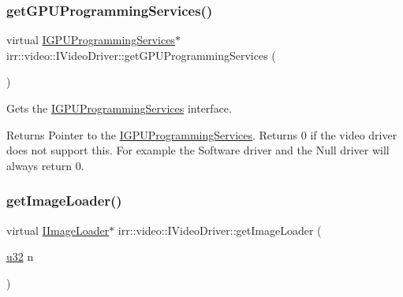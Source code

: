 \subsubsection{\texorpdfstring{get\+G\+P\+U\+Programming\+Services()}{getGPUProgrammingServices()}\hspace{0.1cm}{\footnotesize\ttfamily [2/2]}}
{\footnotesize\ttfamily virtual \hyperlink{classirr_1_1video_1_1IGPUProgrammingServices}{I\+G\+P\+U\+Programming\+Services}$\ast$ irr\+::video\+::\+I\+Video\+Driver\+::get\+G\+P\+U\+Programming\+Services (\begin{DoxyParamCaption}{ }\end{DoxyParamCaption})\hspace{0.3cm}{\ttfamily [pure virtual]}}



Gets the \hyperlink{classirr_1_1video_1_1IGPUProgrammingServices}{I\+G\+P\+U\+Programming\+Services} interface. 

\begin{DoxyReturn}{Returns}
Pointer to the \hyperlink{classirr_1_1video_1_1IGPUProgrammingServices}{I\+G\+P\+U\+Programming\+Services}. Returns 0 if the video driver does not support this. For example the Software driver and the Null driver will always return 0. 
\end{DoxyReturn}
\mbox{\label{classirr_1_1video_1_1IVideoDriver_a5cc08e7cd2ce2a30275e22ce13bb1013}} 
\subsubsection{\texorpdfstring{get\+Image\+Loader()}{getImageLoader()}\hspace{0.1cm}{\footnotesize\ttfamily [1/2]}}
{\footnotesize\ttfamily virtual \hyperlink{classirr_1_1video_1_1IImageLoader}{I\+Image\+Loader}$\ast$ irr\+::video\+::\+I\+Video\+Driver\+::get\+Image\+Loader (\begin{DoxyParamCaption}\item[{\hyperlink{namespaceirr_a0416a53257075833e7002efd0a18e804}{u32}}]{n }\end{DoxyParamCaption})\hspace{0.3cm}{\ttfamily [pure virtual]}}



